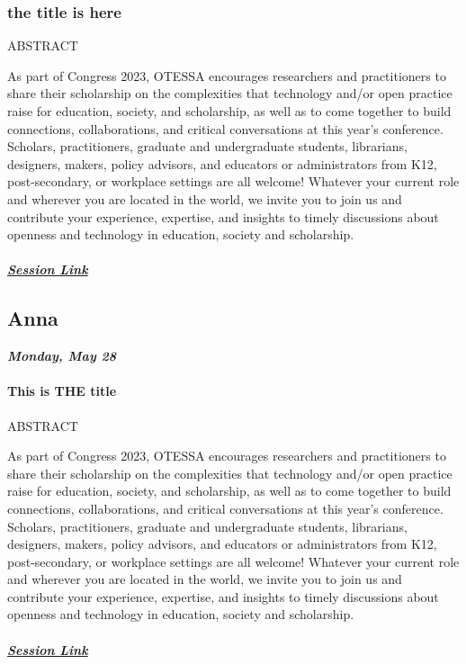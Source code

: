 \documentclass[
]{book}
\begin{document}
\begin{keynote}
\hypertarget{the-title-is-here}{%
\subsubsection{the title is here}\label{the-title-is-here}}

ABSTRACT

As part of Congress 2023, OTESSA encourages researchers and
practitioners to share their scholarship on the complexities that
technology and/or open practice raise for education, society, and
scholarship, as well as to come together to build connections,
collaborations, and critical conversations at this year's conference.
Scholars, practitioners, graduate and undergraduate students,
librarians, designers, makers, policy advisors, and educators or
administrators from K12, post-secondary, or workplace settings are all
welcome! Whatever your current role and wherever you are located in the
world, we invite you to join us and contribute your experience,
expertise, and insights to timely discussions about openness and
technology in education, society and scholarship.

\hypertarget{session-link}{%
\subparagraph{\texorpdfstring{\href{}{Session
Link}}{Session Link}}\label{session-link}}
\end{keynote}

\begin{keynote}
 \hypertarget{anna}{%
 \subsection*{Anna}\label{anna}}
 
 \textbf{\emph{Monday, May 28}}
 
 \hypertarget{this-is-the-title}{%
 \paragraph*{This is THE title}\label{this-is-the-title}}
 
 ABSTRACT
 
 As part of Congress 2023, OTESSA encourages researchers and
 practitioners to share their scholarship on the complexities that
 technology and/or open practice raise for education, society, and
 scholarship, as well as to come together to build connections,
 collaborations, and critical conversations at this year's conference.
 Scholars, practitioners, graduate and undergraduate students,
 librarians, designers, makers, policy advisors, and educators or
 administrators from K12, post-secondary, or workplace settings are all
 welcome! Whatever your current role and wherever you are located in the
 world, we invite you to join us and contribute your experience,
 expertise, and insights to timely discussions about openness and
 technology in education, society and scholarship.
 
 \hypertarget{session-link}{%
 \subparagraph*{\texorpdfstring{\href{}{Session
 Link}}{Session Link}}\label{session-link}}
 \end{keynote}
\end{document}
